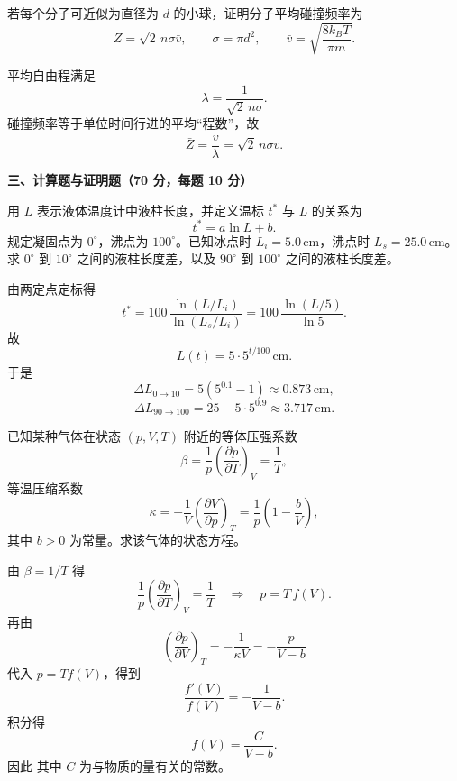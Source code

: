 \begin{question}
若每个分子可近似为直径为 $d$ 的小球，证明分子平均碰撞频率为
\[
\bar Z=\sqrt2\,n\sigma\bar v,
\qquad \sigma=\pi d^2,
\qquad \bar v=\sqrt{\frac{8k_BT}{\pi m}}.
\]
\begin{solution}
平均自由程满足
\[
\lambda=\frac{1}{\sqrt2\,n\sigma}.
\]
碰撞频率等于单位时间行进的平均“程数”，故
\[
\bar Z=\frac{\bar v}{\lambda}=\sqrt2\,n\sigma\bar v.
\]
\end{solution}
\end{question}

\textbf{三、计算题与证明题（70 分，每题 10 分）}
\begin{question}
用 $L$ 表示液体温度计中液柱长度，并定义温标 $t^*$ 与 $L$ 的关系为
\[
t^*=a\ln L+b.
\]
规定凝固点为 $0^\circ$，沸点为 $100^\circ$。已知冰点时 $L_i=5.0\,\mathrm{cm}$，沸点时 $L_s=25.0\,\mathrm{cm}$。求 $0^\circ$ 到 $10^\circ$ 之间的液柱长度差，以及 $90^\circ$ 到 $100^\circ$ 之间的液柱长度差。
\begin{solution}
由两定点定标得
\[
t^*=100\,\frac{\ln(L/L_i)}{\ln(L_s/L_i)}=100\,\frac{\ln(L/5)}{\ln5}.
\]
故
\[
L(t)=5\cdot 5^{t/100}\,\mathrm{cm}.
\]
于是
\[
\Delta L_{0\to10}=5(5^{0.1}-1)\approx0.873\,\mathrm{cm},
\]
\[
\Delta L_{90\to100}=25-5\cdot 5^{0.9}\approx3.717\,\mathrm{cm}.
\]
\end{solution}
\end{question}

\begin{question}
已知某种气体在状态 $(p,V,T)$ 附近的等体压强系数
\[
\beta=\frac1p\left(\frac{\partial p}{\partial T}\right)_V=\frac1T,
\]
等温压缩系数
\[
\kappa=-\frac1V\left(\frac{\partial V}{\partial p}\right)_T=\frac1p\left(1-\frac{b}{V}\right),
\]
其中 $b>0$ 为常量。求该气体的状态方程。
\begin{solution}
由 $\beta=1/T$ 得
\[
\frac{1}{p}\left(\frac{\partial p}{\partial T}\right)_V=\frac1T
\quad\Longrightarrow\quad
p=T\,f(V).
\]
再由
\[
\left(\frac{\partial p}{\partial V}\right)_T=-\frac{1}{\kappa V}=-\frac{p}{V-b}
\]
代入 $p=T f(V)$，得到
\[
\frac{f'(V)}{f(V)}=-\frac{1}{V-b}.
\]
积分得
\[
f(V)=\frac{C}{V-b}.
\]
因此
其中 $C$ 为与物质的量有关的常数。
\end{solution}
\end{question}

